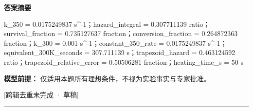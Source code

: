 \documentclass[UTF8,11pt,a4paper]{ctexart}
\begin{document}
\noindent\textbf{答案摘要}\par
k\_350 = 0.0175249837 s\textasciicircum{}-1；hazard\_integral = 0.307711139 ratio；survival\_fraction = 0.735127637 fraction；conversion\_fraction = 0.264872363 fraction；k\_300 = 0.001 s\textasciicircum{}-1；constant\_350\_rate = 0.0175249837 s\textasciicircum{}-1；equivalent\_300K\_seconds = 307.711139 s；trapezoid\_hazard = 0.463124592 ratio；trapezoid\_relative\_error = 0.50506281 fraction；heating\_time\_s = 50 s\par
\noindent\textbf{模型前提：}
仅适用本题所有理想条件，不视为实验事实与专家批准。\par
\noindent\textcolor{red!65!black}{[跨辑去重未完成 · 草稿]} \par
\medskip\hrule\medskip
\end{document}

